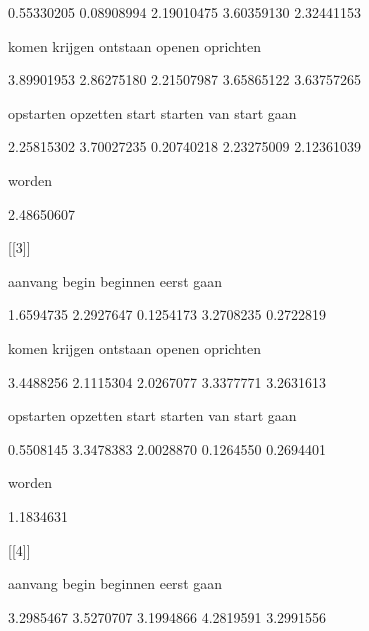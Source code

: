     0.55330205     0.08908994     2.19010475     3.60359130     2.32441153 



         komen        krijgen       ontstaan         openen      oprichten 



    3.89901953     2.86275180     2.21507987     3.65865122     3.63757265 



     opstarten       opzetten          start        starten van start gaan 



    2.25815302     3.70027235     0.20740218     2.23275009     2.12361039 



        worden 



    2.48650607 



[[3]]



       aanvang          begin       beginnen          eerst           gaan 



     1.6594735      2.2927647      0.1254173      3.2708235      0.2722819 



         komen        krijgen       ontstaan         openen      oprichten 



     3.4488256      2.1115304      2.0267077      3.3377771      3.2631613 



     opstarten       opzetten          start        starten van start gaan 



     0.5508145      3.3478383      2.0028870      0.1264550      0.2694401 



        worden 



     1.1834631 



[[4]]



       aanvang          begin       beginnen          eerst           gaan 



     3.2985467      3.5270707      3.1994866      4.2819591      3.2991556 



